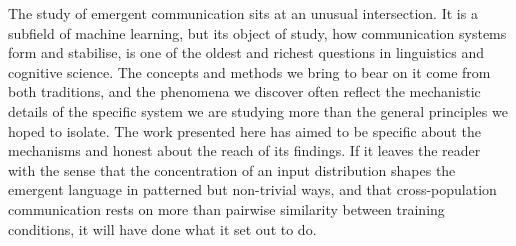 The study of emergent communication sits at an unusual intersection. It is a subfield of machine learning, but its object of study, how communication systems form and stabilise, is one of the oldest and richest questions in linguistics and cognitive science. The concepts and methods we bring to bear on it come from both traditions, and the phenomena we discover often reflect the mechanistic details of the specific system we are studying more than the general principles we hoped to isolate. The work presented here has aimed to be specific about the mechanisms and honest about the reach of its findings. If it leaves the reader with the sense that the concentration of an input distribution shapes the emergent language in patterned but non-trivial ways, and that cross-population communication rests on more than pairwise similarity between training conditions, it will have done what it set out to do.